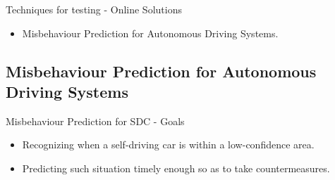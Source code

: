\documentclass[aspectratio=1610,17pt,utf8]{beamer}
\begin{document}
\begin{frame}{Techniques for testing - Online Solutions}
  \begin{itemize}
    \item Misbehaviour Prediction for Autonomous Driving Systems.
  \end{itemize}
  
\end{frame}

\subsection{Misbehaviour Prediction for Autonomous Driving Systems}
\begin{frame}{Misbehaviour Prediction for SDC - Goals}
  \begin{itemize}
    \item Recognizing when a self-driving car is within a low-confidence area.
    \item Predicting such situation timely enough so as to take countermeasures.
  \end{itemize}
  
\end{frame}
\end{document}

